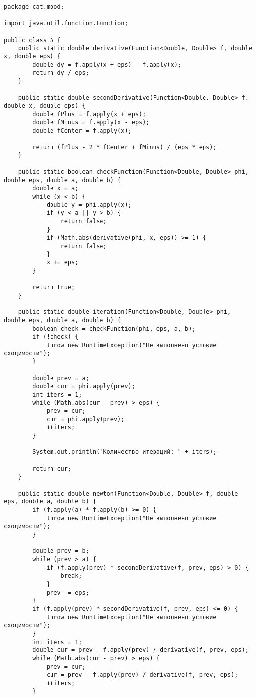 \begin{verbatim}
package cat.mood;

import java.util.function.Function;

public class A {
    public static double derivative(Function<Double, Double> f, double x, double eps) {
        double dy = f.apply(x + eps) - f.apply(x);
        return dy / eps;
    }

    public static double secondDerivative(Function<Double, Double> f, double x, double eps) {
        double fPlus = f.apply(x + eps);
        double fMinus = f.apply(x - eps);
        double fCenter = f.apply(x);

        return (fPlus - 2 * fCenter + fMinus) / (eps * eps);
    }

    public static boolean checkFunction(Function<Double, Double> phi, double eps, double a, double b) {
        double x = a;
        while (x < b) {
            double y = phi.apply(x);
            if (y < a || y > b) {
                return false;
            }
            if (Math.abs(derivative(phi, x, eps)) >= 1) {
                return false;
            }
            x += eps;
        }

        return true;
    }

    public static double iteration(Function<Double, Double> phi, double eps, double a, double b) {
        boolean check = checkFunction(phi, eps, a, b);
        if (!check) {
            throw new RuntimeException("Не выполнено условие сходимости");
        }

        double prev = a;
        double cur = phi.apply(prev);
        int iters = 1;
        while (Math.abs(cur - prev) > eps) {
            prev = cur;
            cur = phi.apply(prev);
            ++iters;
        }

        System.out.println("Количество итераций: " + iters);

        return cur;
    }

    public static double newton(Function<Double, Double> f, double eps, double a, double b) {
        if (f.apply(a) * f.apply(b) >= 0) {
            throw new RuntimeException("Не выполнено условие сходимости");
        }

        double prev = b;
        while (prev > a) {
            if (f.apply(prev) * secondDerivative(f, prev, eps) > 0) {
                break;
            }
            prev -= eps;
        }
        if (f.apply(prev) * secondDerivative(f, prev, eps) <= 0) {
            throw new RuntimeException("Не выполнено условие сходимости");
        }
        int iters = 1;
        double cur = prev - f.apply(prev) / derivative(f, prev, eps);
        while (Math.abs(cur - prev) > eps) {
            prev = cur;
            cur = prev - f.apply(prev) / derivative(f, prev, eps);
            ++iters;
        }


\end{verbatim}
